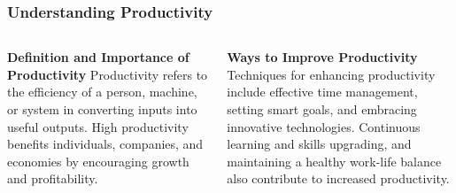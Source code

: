 \documentclass[5pt]{beamer}
\begin{document}
\begin{frame}
\frametitle{Understanding Productivity}
\begin{columns}
\begin{column}{0.45\textwidth}
\begin{block}{\textbf{Definition and Importance of Productivity}}
Productivity refers to the efficiency of a person, machine, or system in converting inputs into useful outputs. High productivity benefits individuals, companies, and economies by encouraging growth and profitability.
\end{block}
\end{column}
\begin{column}{0.45\textwidth}
\begin{block}{\textbf{Ways to Improve Productivity}}
Techniques for enhancing productivity include effective time management, setting smart goals, and embracing innovative technologies. Continuous learning and skills upgrading, and maintaining a healthy work-life balance also contribute to increased productivity.
\end{block}
\end{column}
\end{columns}
\end{frame}
\end{document}
